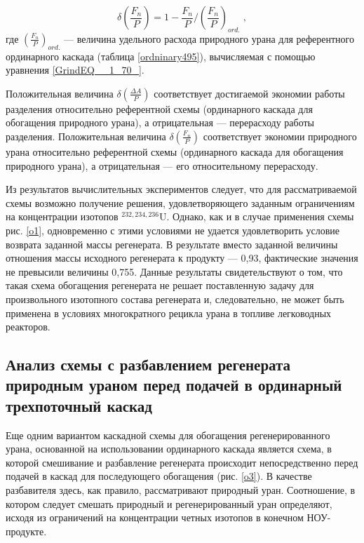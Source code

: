 \begin{equation} \label{DeltaFnu} 
  \delta(\frac{F_n}{P})=1-\frac{F_n}{P}/(\frac{F_n}{P})_{ord.} \; ,
\end{equation} 
где $(\frac{F_n}{P})_{ord.}$ --- величина удельного расхода природного урана для референтного ординарного каскада (таблица \ref{ordninary495}), вычисляемая с помощью уравнения \ref{GrindEQ__1_70_}.

Положительная величина $\delta(\frac{\Delta A}{P})$ соответствует достигаемой экономии работы разделения относительно референтной схемы (ординарного каскада для обогащения природного урана), а отрицательная --- перерасходу работы разделения. Положительная величина $\delta(\frac{F_n}{P})$ соответствует экономии природного урана относительно референтной схемы (ординарного каскада для обогащения природного урана), а отрицательная --- его относительному перерасходу.


Из результатов вычислительных экспериментов следует, что для рассматриваемой схемы возможно получение решения, удовлетворяющего заданным ограничениям на концентрации изотопов $^{232,234,236}$U. Однако, как и в случае применения схемы рис. \ref{o1}, одновременно с этими условиями не удается удовлетворить условие возврата заданной массы регенерата. В результате вместо заданной величины отношения массы исходного регенерата к продукту --- 0,93, фактические значения не превысили величины 0,755. Данные результаты свидетельствуют о том, что такая схема обогащения регенерата не решает поставленную задачу для произвольного изотопного состава регенерата и, следовательно, не может быть применена в условиях многократного рецикла урана в топливе легководных реакторов.


\subsection{Анализ схемы с разбавлением регенерата природным ураном перед подачей в ординарный трехпоточный каскад}

Еще одним вариантом каскадной схемы для обогащения регенерированного урана, основанной на использовании ординарного каскада является схема, в которой смешивание и разбавление регенерата происходит непосредственно перед подачей в каскад для последующего обогащения (рис. \ref{o3}). В качестве разбавителя здесь, как правило, рассматривают природный уран. Соотношение, в котором следует смешать природный и регенерированный уран определяют, исходя из ограничений на концентрации четных изотопов в конечном НОУ-продукте.

